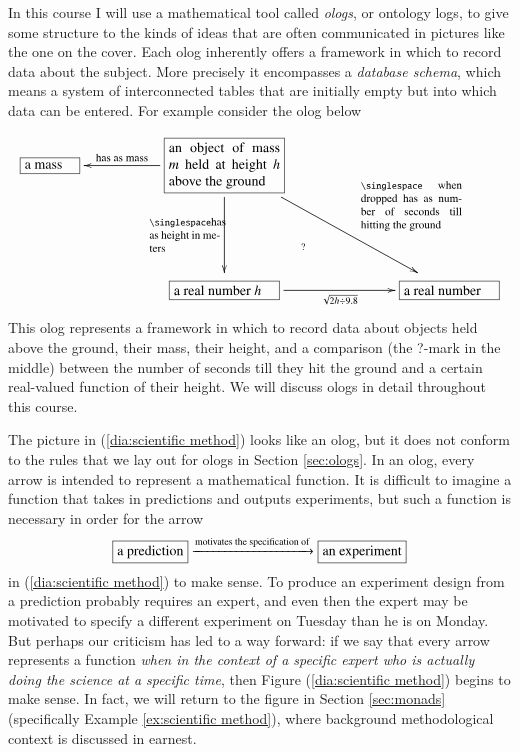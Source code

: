 \documentclass[a4paper]{ltjsbook}
\def\tn{\textnormal}
\newcommand{\LA}[2]{\ar[#1]^-{\tn {#2}}}
\newcommand{\LAL}[2]{\ar[#1]_-{\tn {#2}}}
\newcommand{\obox}[3]{\stackrel{#1}{\fbox{\parbox{#2}{#3}}}}
\newcommand{\To}[1]{\xrightarrow{#1}}
\theoremstyle{remark}
\theoremstyle{definition}
\begin{document}
In this course I will use a mathematical tool called {\em ologs}, or ontology logs, to give some structure to the kinds of ideas that are often communicated in pictures like the one on the cover. Each olog inherently offers a framework in which to record data about the subject. More precisely it encompasses a {\em database schema}, which means a system of interconnected tables that are initially empty but into which data can be entered. For example consider the olog below
$$\xymatrix{
\obox{}{.5in}{a mass}&&\obox{}{1.1in}{an object of mass $m$ held at height $h$ above the ground}\LAL{ll}{\footnotesize has as mass}\LA{rrdd}{\hspace{.4in}\parbox{1in}{\singlespace \footnotesize when dropped has as number of seconds till hitting the ground}}\LAL{dd}{\parbox{.7in}{\singlespace\footnotesize has as height in meters}}&&\\\\
&&\obox{}{1in}{a real number $h$}\ar@{}[uurr]|(.35){?}\ar[rr]_-{\sqrt{2h\div 9.8}}&\hspace{.3in}&\obox{}{.9in}{a real number}
}
$$
This olog represents a framework in which to record data about objects held above the ground, their mass, their height, and a comparison (the ?-mark in the middle) between the number of seconds till they hit the ground and a certain real-valued function of their height. We will discuss ologs in detail throughout this course. 

The picture in (\ref{dia:scientific method}) looks like an olog, but it does not conform to the rules that we lay out for ologs in Section \ref{sec:ologs}. In an olog, every arrow is intended to represent a mathematical function. It is difficult to imagine a function that takes in predictions and outputs experiments, but such a function is necessary in order for the arrow
$$\fbox{a prediction}\To{\tn{motivates the specification of}}\fbox{an experiment}
$$
in (\ref{dia:scientific method}) to make sense. To produce an experiment design from a prediction probably requires an expert, and even then the expert may be motivated to specify a different experiment on Tuesday than he is on Monday. But perhaps our criticism has led to a way forward: if we say that every arrow represents a function {\em when in the context of a specific expert who is actually doing the science at a specific time}, then Figure (\ref{dia:scientific method}) begins to make sense. In fact, we will return to the figure in Section \ref{sec:monads} (specifically Example \ref{ex:scientific method}), where background methodological context is discussed in earnest.
\end{document}
